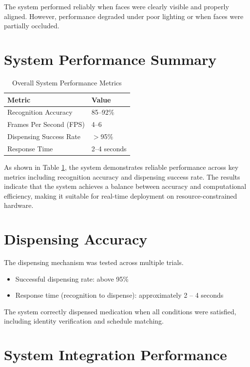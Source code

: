 The system performed reliably when faces were clearly visible and properly aligned. However, performance degraded under poor lighting or when faces were partially occluded.
\section{System Performance Summary}

\begin{table}[H]
\centering
\begin{tabular}{|p{6cm}|p{6cm}|}
\hline
\textbf{Metric} & \textbf{Value} \\
\hline
Recognition Accuracy & 85--92\% \\
Frames Per Second (FPS) & 4--6 \\
Dispensing Success Rate & $>$95\% \\
Response Time & 2--4 seconds \\
\hline
\end{tabular}
\caption{Overall System Performance Metrics}
\label{tab:performance}
\end{table}
As shown in Table \ref{tab:performance}, the system demonstrates reliable performance across key metrics including recognition accuracy and dispensing success rate.
The results indicate that the system achieves a balance between accuracy and computational efficiency, making it suitable for real-time deployment on resource-constrained hardware.


\section{Dispensing Accuracy}

The dispensing mechanism was tested across multiple trials.

\begin{itemize}
    \item Successful dispensing rate: above 95\%
    \item Response time (recognition to dispense): approximately 2 -- 4 seconds
\end{itemize}

The system correctly dispensed medication when all conditions were satisfied, including identity verification and schedule matching.

\section{System Integration Performance}

